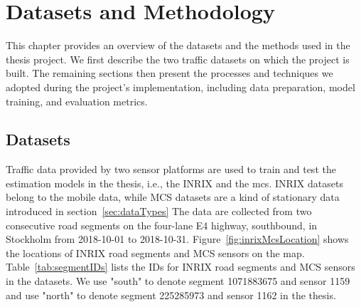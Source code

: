 \documentclass[english]{kththesis}
\begin{document}
\chapter{Datasets and Methodology}
\label{ch:methodologyAndDatasets}
This chapter provides an overview of the datasets and the methods used in the thesis project. We first describe the two traffic datasets on which the project is built. The remaining sections then present the processes and techniques we adopted during the project's implementation, including data preparation, model training, and evaluation metrics.

\section{Datasets}
\label{sec:datasets}
Traffic data provided by two sensor platforms are used to train and test the estimation models in the thesis, i.e., the INRIX and the \gls{mcs}. INRIX datasets belong to the mobile data, while MCS datasets are a kind of stationary data introduced in section~\ref{sec:dataTypes} The data are collected from two consecutive road segments on the four-lane E4 highway, southbound, in Stockholm from 2018-10-01 to 2018-10-31. Figure~\ref{fig:inrixMcsLocation} shows the locations of INRIX road segments and MCS sensors on the map. Table~\ref{tab:segmentIDs} lists the IDs for INRIX road segments and MCS sensors in the datasets. We use "south" to denote segment 1071883675 and sensor 1159 and use "north" to denote segment 225285973 and sensor 1162 in the thesis.
\end{document}
